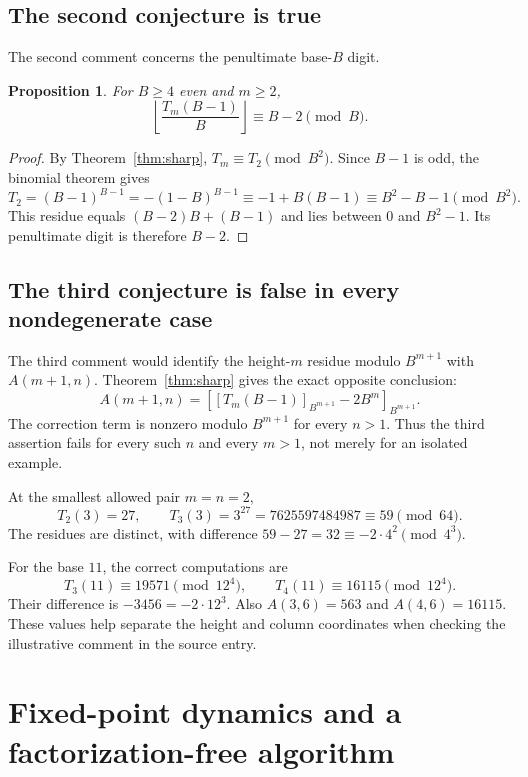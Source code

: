 \documentclass[11pt,letterpaper]{article}
\numberwithin{equation}{section}
\newtheorem{proposition}[theorem]{Proposition}
\theoremstyle{definition}
\theoremstyle{remark}
\newcommand{\res}[2]{\left[#1\right]_{#2}}
\newcommand{\floor}[1]{\left\lfloor #1\right\rfloor}
\begin{document}
\subsection{The second conjecture is true}

The second comment concerns the penultimate base-$B$ digit.

\begin{proposition}\label{prop:oeis2}
For $B\ge4$ even and $m\ge2$,
\[
 \floor{\frac{T_m(B-1)}{B}}\equiv B-2\pmod B.
\]
\end{proposition}
\begin{proof}
By Theorem~\ref{thm:sharp}, $T_m\equiv T_2\pmod{B^2}$. Since $B-1$ is odd, the binomial theorem gives
\[
 T_2=(B-1)^{B-1}=-(1-B)^{B-1}
 \equiv -1+B(B-1)\equiv B^2-B-1\pmod{B^2}.
\]
This residue equals $(B-2)B+(B-1)$ and lies between $0$ and $B^2-1$. Its penultimate digit is therefore $B-2$.
\end{proof}

\subsection{The third conjecture is false in every nondegenerate case}

The third comment would identify the height-$m$ residue modulo $B^{m+1}$ with $A(m+1,n)$. Theorem~\ref{thm:sharp} gives the exact opposite conclusion:
\begin{equation}\label{eq:oeisrepair}
 \boxed{\ A(m+1,n)=
 \res{\res{T_m(B-1)}{B^{m+1}}-2B^m}{B^{m+1}}.\ }
\end{equation}
The correction term is nonzero modulo $B^{m+1}$ for every $n>1$. Thus the third assertion fails for every such $n$ and every $m>1$, not merely for an isolated example.

At the smallest allowed pair $m=n=2$,
\[
 T_2(3)=27,\qquad T_3(3)=3^{27}=7625597484987\equiv59\pmod{64}.
\]
The residues are distinct, with difference $59-27=32\equiv-2\cdot4^2\pmod{4^3}$.

For the base $11$, the correct computations are
\[
 T_3(11)\equiv19571\pmod{12^4},\qquad
 T_4(11)\equiv16115\pmod{12^4}.
\]
Their difference is $-3456=-2\cdot12^3$. Also $A(3,6)=563$ and $A(4,6)=16115$. These values help separate the height and column coordinates when checking the illustrative comment in the source entry.

\section{Fixed-point dynamics and a factorization-free algorithm}\label{sec:algorithm}
\end{document}
